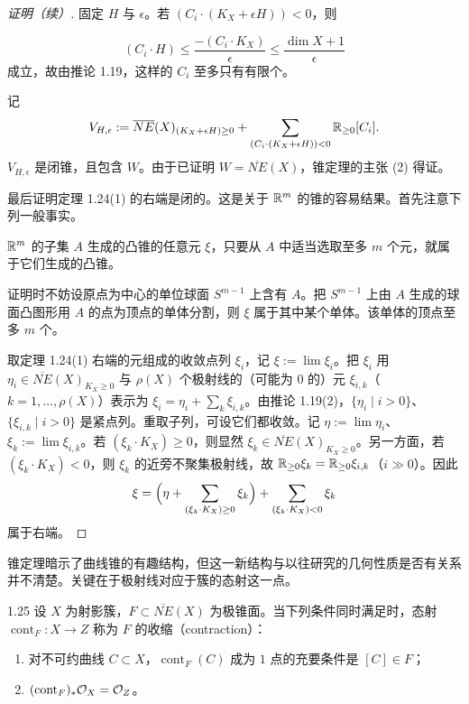 \begin{proof}[证明（续）]

固定 $H$ 与 $\epsilon$。若 $(C_i\cdot(K_X+\epsilon H))<0$，则

\[ (C_i\cdot H)\le\frac{-(C_i\cdot K_X)}{\epsilon}\le\frac{\dim X+1}{\epsilon} \]
成立，故由推论 1.19，这样的 $C_i$ 至多只有有限个。

记
\[ V_{H,\epsilon}:=\overline{NE}(X)_{(K_X+\epsilon H)\ge0}+\sum_{(C_i\cdot(K_X+\epsilon H))<0}\mathbb{R}_{\ge0}[C_i]. \]
$V_{H,\epsilon}$ 是闭锥，且包含 $W$。由于已证明 $W=\overline{NE}(X)$，锥定理的主张 (2) 得证。

最后证明定理 1.24(1) 的右端是闭的。这是关于 $\mathbb{R}^m$ 的锥的容易结果。首先注意下列一般事实。

$\mathbb{R}^m$ 的子集 $A$ 生成的凸锥的任意元 $\xi$，只要从 $A$ 中适当选取至多 $m$ 个元，就属于它们生成的凸锥。

证明时不妨设原点为中心的单位球面 $S^{m-1}$ 上含有 $A$。把 $S^{m-1}$ 上由 $A$ 生成的球面凸图形用 $A$ 的点为顶点的单体分割，则 $\xi$ 属于其中某个单体。该单体的顶点至多 $m$ 个。

取定理 1.24(1) 右端的元组成的收敛点列 $\xi_i$，记 $\xi:=\lim\xi_i$。把 $\xi_i$ 用 $\eta_i\in\overline{NE}(X)_{K_X\ge0}$ 与 $\rho(X)$ 个极射线的（可能为 $0$ 的）元 $\xi_{i,k}$（$k=1,\dots,\rho(X)$）表示为 $\xi_i=\eta_i+\sum_k\xi_{i,k}$。由推论 1.19(2)，$\{\eta_i\mid i>0\}$、$\{\xi_{i,k}\mid i>0\}$ 是紧点列。重取子列，可设它们都收敛。记 $\eta:=\lim\eta_i$、$\xi_k:=\lim\xi_{i,k}$。若 $(\xi_k\cdot K_X)\ge0$，则显然 $\xi_k\in\overline{NE}(X)_{K_X\ge0}$。另一方面，若 $(\xi_k\cdot K_X)<0$，则 $\xi_k$ 的近旁不聚集极射线，故 $\mathbb{R}_{\ge0}\xi_k=\mathbb{R}_{\ge0}\xi_{i,k}$（$i\gg0$）。因此
\[ \xi=\Bigl(\eta+\sum_{(\xi_k\cdot K_X)\ge0}\xi_k\Bigr)+\sum_{(\xi_k\cdot K_X)<0}\xi_k \]
属于右端。
\end{proof}

锥定理暗示了曲线锥的有趣结构，但这一新结构与以往研究的几何性质是否有关系并不清楚。关键在于极射线对应于簇的态射这一点。

\begin{definition}{1.25}
设 $X$ 为射影簇，$F\subset\overline{NE}(X)$ 为极锥面。当下列条件同时满足时，态射 $\operatorname{cont}_F:X\to Z$ 称为 $F$ 的收缩（contraction）：
\begin{enumerate}
\item 对不可约曲线 $C\subset X$，$\operatorname{cont}_F(C)$ 成为 $1$ 点的充要条件是 $[C]\in F$；
\item $(\operatorname{cont}_F)_*\mathcal{O}_X=\mathcal{O}_Z$。
\end{enumerate}
\end{definition}

